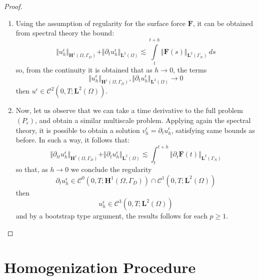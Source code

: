 \begin{proof}
\begin{enumerate}
    
    \item Using the assumption of regularity for the surface force $\mathbf{F}$, it can be obtained from spectral theory the bound:
    \begin{equation*}
        \Vert u_h^{\epsilon} \Vert_{\mathbf{H}^1(\Omega, \Gamma_D)} + \Vert \partial_t u_h^{\epsilon}\Vert_{\mathbf{L}^2(\Omega)} \lesssim \int \limits_t^{t+h} \Vert \mathbf{F}(s) \Vert_{\mathbf{L}^2(\Gamma_N)} \, ds
    \end{equation*}
    so, from the continuity it is obtained that as $h \rightarrow 0$, the terms 
    \begin{equation*}
        \Vert u_h^{\epsilon} \Vert_{\mathbf{H}^1(\Omega, \Gamma_D)}, \Vert \partial_t u_h^{\epsilon} \Vert_{\mathbf{L}^2 (\Omega)} \rightarrow 0
    \end{equation*}
    then $u^{\epsilon} \in \mathcal{C}^2(0,T; \mathbf{L}^2(\Omega))$.
    
    
    \item Now, let us observe that we can take a time derivative to the full problem $(P_{\epsilon})$, and obtain a similar multiscale problem. Applying again the spectral theory, it is possible to obtain a solution $v_h^{\epsilon} = \partial_t u_h^{\epsilon}$, satisfying same bounds as before. In such a way, it follows that:
    \begin{equation*}
        \Vert \partial_{tt} u_h^{\epsilon} \Vert_{\mathbf{H}^1(\Omega, \Gamma_D)} + \Vert \partial_t u_h^{\epsilon} \Vert_{\mathbf{L}^2 (\Omega)} \lesssim \int_t^{t+h} \Vert \partial_t \mathbf{F}(t) \Vert_{\mathbf{L}^2(\Gamma_N)}
    \end{equation*}
    so that, as $h \rightarrow 0$ we conclude the regularity
    \begin{equation*}
        \partial_t u_h^{\epsilon} \in \mathcal{C}^0(0,T;\mathbf{H}^1(\Omega, \Gamma_D)) \cap \mathcal{C}^1(0,T;\mathbf{L}^2(\Omega)) 
    \end{equation*}
    then
    \begin{equation*}
        u_h^{\epsilon} \in \mathcal{C}^3(0,T; \mathbf{L}^2(\Omega))
    \end{equation*}
    and by a bootstrap type argument, the results follows for each $p \geq 1$.
\end{enumerate}

\end{proof}



\section{Homogenization Procedure}

